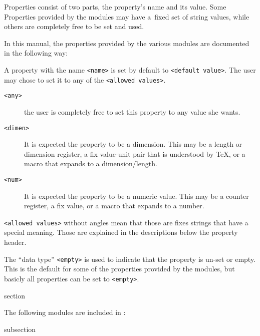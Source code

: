 Properties consist of two parts, the property's name and its
value. Some Properties provided by the {\CoCoTeX} modules may have
a~fixed set of string values, while others are completely free to be
set and used.

In this manual, the properties provided by the various modules are
documented in the following way:

{\let\noindex\relax{}}

A property with the name \texttt{<name>} is set by default to
\texttt{<default value>}. The user may chose to set it to any of the
\texttt{<allowed values>}.
\begin{description}
\item[\texttt{<any>}]  the user is completely free to set this
  property to any value she wants.
\item[\texttt{<dimen>}] It is expected the property to be a
  dimension. This may be a length or dimension register, a fix
  value-unit pair that is understood by \TeX, or a macro that expands
  to a dimension/length.
\item[\texttt{<num>}] It is expected the property to be a numeric
  value. This may be a counter register, a fix value, or a macro that
  expands to a number.
\end{description}
\lstinline{<allowed values>} without angles mean that those are fixes
strings that have a special meaning. Those are explained in the
descriptions below the property header.

The “data type” \texttt{<empty>} is used to indicate that the property
is un-set or empty. This is the default for some of the properties
provided by the {\CoCoTeX} modules, but basicly all properties can
be set to \texttt{<empty>}.


\begin{Heading}{section}
\end{Heading}

The following modules are included in {\CoCoTeX}:

\begin{Heading}{subsection}
\end{Heading}

